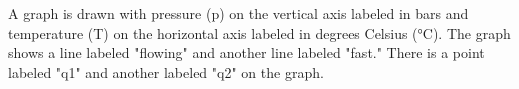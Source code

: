 A graph is drawn with pressure (p) on the vertical axis labeled in bars and temperature (T) on the horizontal axis labeled in degrees Celsius (°C). The graph shows a line labeled "flowing" and another line labeled "fast." There is a point labeled "q1" and another labeled "q2" on the graph.